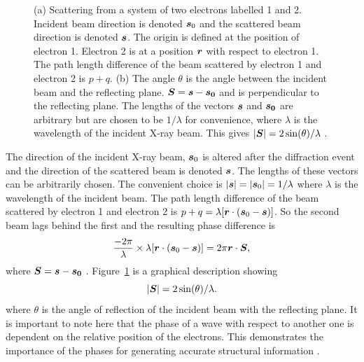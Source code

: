 \begin{figure}
\begin{subfigure}[b]{0.45\textwidth}
                        \caption{}
                        \label{fig:scattering vector}
                \end{subfigure}
                \caption{(a) Scattering from a system of two electrons labelled 1 and 2. Incident beam direction is denoted $\boldsymbol{s}_0$ and the scattered beam direction is denoted $\boldsymbol{s}$. The origin is defined at the position of electron 1. Electron 2 is at a position $\boldsymbol{r}$ with respect to electron 1.
                The path length difference of the beam scattered by electron 1 and electron 2 is $p + q$.
                (b) The angle $\theta$ is the angle between the incident beam and the reflecting plane. $\boldsymbol{S} = \boldsymbol{s} - \boldsymbol{s_0}$ and is perpendicular to the reflecting plane. The lengths of the vectors $\boldsymbol{s}$ and $\boldsymbol{s_0}$ are arbitrary but are chosen to be $1/\lambda$ for convenience, where $\lambda$ is the wavelength of the incident X-ray beam. This gives $|\boldsymbol{S}| = 2 \sin(\theta)/\lambda$ \cite{drenth1999}.}
        		\label{fig:Scattering from two electrons}
            \end{figure}
            The direction of the incident X-ray beam, $\boldsymbol{s}_0$ is altered after the diffraction event and the direction of the scattered beam is denoted $\boldsymbol{s}$. The lengths of these vectors can be arbitrarily chosen. The convenient choice is $|\boldsymbol{s}| = |\boldsymbol{s}_0| = 1/\lambda$ where $\lambda$ is the wavelength of the incident beam. The path length difference of the beam scattered by electron 1 and electron 2 is $p + q = \lambda[\boldsymbol{r} \cdot (\boldsymbol{s}_0 - \boldsymbol{s})]$. So the second beam lags behind the first and the resulting phase difference is
            \begin{equation}
                \frac{-2 \pi}{\lambda} \times \lambda[\boldsymbol{r} \cdot (\boldsymbol{s}_0 - \boldsymbol{s})] = 2 \pi \boldsymbol{r} \cdot \boldsymbol{S},
            \end{equation}
            where $\boldsymbol{S} = \boldsymbol{s} - \boldsymbol{s_0}$ \cite{drenth1999}. Figure~\ref{fig:scattering vector} is a graphical description showing
            \begin{equation}
                |\boldsymbol{S}| = 2 \sin(\theta)/\lambda.
                \label{eq:length of vector S}
            \end{equation}
            where $\theta$ is the angle of reflection of the incident beam with the reflecting plane. It is important to note here that the phase of a wave with respect to another one is dependent on the relative position of the electrons. This demonstrates the importance of the phases for generating accurate structural information \cite{taylor2003phase, taylor2010}.

